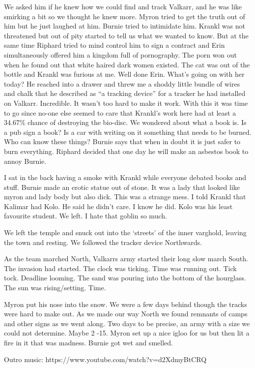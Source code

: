 We asked him if he knew how we could find and track Valkarr, and he was like smirking a bit so we thought he knew more. Myron tried to get the truth out of him but he just laughed at him. Burnie tried to intimidate him. Krankl was not threatened but out of pity started to tell us what we wanted to know. But at the same time Riphard tried to mind control him to sign a contract and Erin simultaneously offered him a kingdom full of pornography. The porn won out when he found out that white haired dark women existed. The cat was out of the bottle and Krankl was furious at me. Well done Erin. What’s going on with her today? He reached into a drawer and threw me a shoddy little bundle of wires and chalk that he described as “a tracking device” for a tracker he had installed on Valkarr. Incredible. It wasn’t too hard to make it work. With this it was time to go since no-one else seemed to care that Krankl’s work here had at least a 34.67\% chance of destroying the bio-disc. We wondered about what a book is. Is a pub sign a book? Is a car with writing on it something that needs to be burned. Who can know these things? Burnie says that when in doubt it is just safer to burn everything. Riphard decided that one day he will make an asbestos book to annoy Burnie.\medskip

I sat in the back having a smoke with Krankl while everyone debated books and stuff. Burnie made an erotic statue out of stone. It was a lady that looked like myron and lady body but also dick. This was a strange mess. I told Krankl that Kalimar had Kolo. He said he didn’t care. I know he did. Kolo was his least favourite student. We left. I hate that goblin so much.\medskip

We left the temple and snuck out into the ‘streets’ of the inner varghold, leaving the town and resting. We followed the tracker device Northwards.\medskip

As the team marched North, Valkarrs army started their long slow march South. The invasion had started. The clock was ticking. Time was running out. Tick tock. Deadline looming. The sand was pouring into the bottom of the hourglass. The sun was rising/setting. Time.\medskip

Myron put his nose into the snow. We were a few days behind though the tracks were hard to make out. As we made our way North we found remnants of camps and other signs as we went along. Two days to be precise, an army with a size we could not determine. Maybe 2 -15. Myron set up a nice igloo for us but then lit a fire in it that was madness. Burnie got wet and smelled.\medskip

Outro music: https://www.youtube.com/watch?v=d2XdmyBtCRQ\medskip

\vspace*{5mm}
